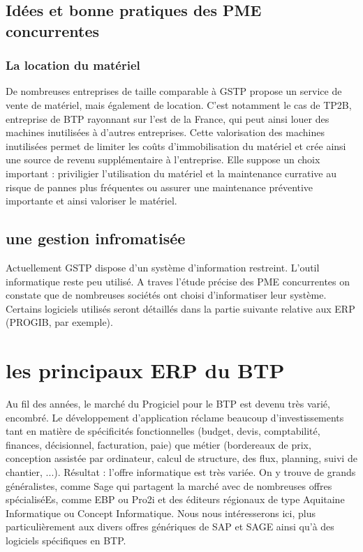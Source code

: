 \subsection{Idées et bonne pratiques des PME concurrentes}
\subsubsection{La location du matériel}
De nombreuses entreprises de taille comparable à GSTP propose un service de vente de matériel, mais également de location. 
C'est notamment le cas de TP2B, entreprise de BTP rayonnant sur l'est de la France, qui peut ainsi louer des machines inutilisées à d'autres entreprises.
Cette valorisation des machines inutilisées permet de limiter les coûts d'immobilisation du matériel et crée ainsi une source de revenu supplémentaire à l'entreprise. Elle suppose un choix important : 
priviligier l'utilisation du matériel et la maintenance currative au risque de pannes plus fréquentes
ou assurer une maintenance préventive importante et ainsi valoriser le matériel.

\subsection{une gestion infromatisée}
Actuellement GSTP dispose d'un système d'information restreint. L'outil informatique reste peu utilisé.
A traves l'étude précise des PME concurrentes on constate que de nombreuses sociétés ont choisi d'informatiser leur système.
Certains logiciels utilisés seront détaillés dans la partie suivante relative aux ERP (PROGIB, par exemple).

\section{les principaux ERP du BTP}
Au fil des années, le marché du Progiciel pour le BTP est devenu très varié, encombré. 
Le développement d'application réclame beaucoup d'investissements tant en matière de spécificités fonctionnelles (budget, devis, comptabilité, finances, décisionnel, facturation, paie) que métier (bordereaux de prix, conception assistée par ordinateur, calcul de structure, des flux, planning, suivi de chantier, ...). 
Résultat : l'offre informatique est très variée. On y trouve de grands généralistes, comme Sage qui partagent la marché avec de nombreuses offres spécialiséEs, comme EBP ou Pro2i et des éditeurs régionaux de type Aquitaine Informatique ou Concept Informatique.
Nous nous intéresserons ici, plus particulièrement aux divers offres génériques de SAP et SAGE ainsi qu'à des logiciels spécifiques en BTP.
